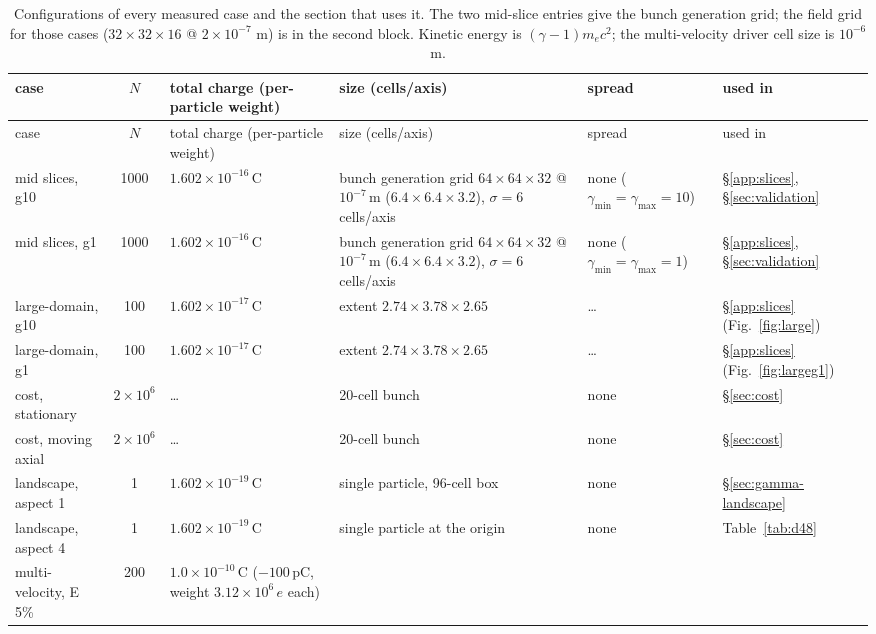 \begingroup
\footnotesize
\setlength{\tabcolsep}{3pt}
\renewcommand{\arraystretch}{1.05}
\begin{longtable}{@{}p{1.9cm}cp{2.2cm}p{2.7cm}p{2.7cm}p{2.7cm}@{}}
\caption{Configurations of every measured case and the section that uses it.
The two mid-slice entries give the bunch generation grid; the
field grid for those cases ($32\times32\times16$ @ $2\times10^{-7}$ m) is
in the second block. Kinetic energy is $(\gamma-1) m_ec^2$; the
multi-velocity driver cell size is $10^{-6}$ m.}
\label{tab:configs}\\
\toprule
case & $N$ & total charge (per-particle weight) & size (cells/axis) & spread & used in \\
\midrule
\endfirsthead
\toprule
case & $N$ & total charge (per-particle weight) & size (cells/axis) & spread & used in \\
\midrule
\endhead
\bottomrule
\endfoot
mid slices, g10 & 1000 & $1.602\times10^{-16}$\,C
  & bunch generation grid $64\times64\times32$ @ $10^{-7}$\,m ($6.4\times6.4\times3.2$), $\sigma\!=\!6$ cells/axis
  & none ($\gamma_{\min}\!=\!\gamma_{\max}\!=\!10$)
  & \S\ref{app:slices}, \S\ref{sec:validation} \\
mid slices, g1 & 1000 & $1.602\times10^{-16}$\,C
  & bunch generation grid $64\times64\times32$ @ $10^{-7}$\,m ($6.4\times6.4\times3.2$), $\sigma\!=\!6$ cells/axis
  & none ($\gamma_{\min}\!=\!\gamma_{\max}\!=\!1$)
  & \S\ref{app:slices}, \S\ref{sec:validation} \\
large-domain, g10 & 100 & $1.602\times10^{-17}$\,C
  & extent $2.74\times3.78\times2.65$
  & \dots
  & \S\ref{app:slices} (Fig.~\ref{fig:large}) \\
large-domain, g1 & 100 & $1.602\times10^{-17}$\,C
  & extent $2.74\times3.78\times2.65$
  & \dots
  & \S\ref{app:slices} (Fig.~\ref{fig:largeg1}) \\
cost, stationary & $2\times10^6$ & \dots
  & 20-cell bunch
  & none
  & \S\ref{sec:cost} \\
cost, moving axial & $2\times10^6$ & \dots
  & 20-cell bunch
  & none
  & \S\ref{sec:cost} \\
landscape, aspect 1 & 1 & $1.602\times10^{-19}$\,C
  & single particle, 96-cell box
  & none
  & \S\ref{sec:gamma-landscape} \\
landscape, aspect 4 & 1 & $1.602\times10^{-19}$\,C
  & single particle at the origin
  & none
  & Table~\ref{tab:d48} \\
 multi-velocity, E 5\% & 200 & $1.0\times10^{-10}$\,C ($-100$\,pC, weight $3.12\times10^{6}\,e$ each)

\end{longtable}
